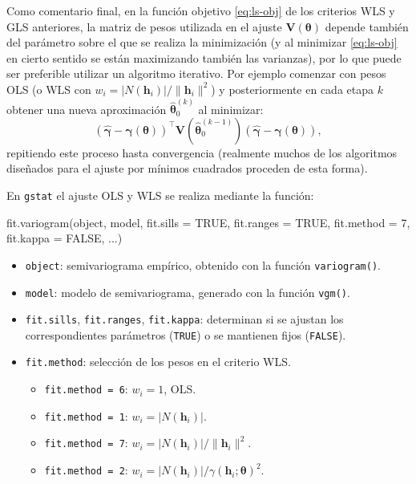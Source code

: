 \documentclass[
  spanish,
]{book}
\newenvironment{Shaded}{\begin{snugshade}}{\end{snugshade}}
\newcommand{\AttributeTok}[1]{\textcolor[rgb]{0.77,0.63,0.00}{#1}}
\newcommand{\ConstantTok}[1]{\textcolor[rgb]{0.00,0.00,0.00}{#1}}
\newcommand{\DecValTok}[1]{\textcolor[rgb]{0.00,0.00,0.81}{#1}}
\newcommand{\FunctionTok}[1]{\textcolor[rgb]{0.00,0.00,0.00}{#1}}
\newcommand{\NormalTok}[1]{#1}
\providecommand{\tightlist}{%
  \setlength{\itemsep}{0pt}\setlength{\parskip}{0pt}}
\theoremstyle{break}
\theoremstyle{definition}
\theoremstyle{definition}
\theoremstyle{definition}
\theoremstyle{definition}
\theoremstyle{remark}
\begin{document}
Como comentario final, en la función objetivo \eqref{eq:ls-obj} de los criterios WLS y GLS anteriores, la matriz de pesos utilizada en el ajuste \(\mathbf{V}(\boldsymbol{\theta})\) depende también del parámetro sobre el que se realiza la minimización (y al minimizar \eqref{eq:ls-obj} en cierto sentido se están maximizando también las varianzas), por lo que puede ser preferible utilizar un algoritmo iterativo.
Por ejemplo comenzar con pesos OLS (o WLS con \(w_{i} = \left| N(\mathbf{h}_{i})\right| / \| \mathbf{h}_{i} \|^2\)) y posteriormente en cada etapa \(k\) obtener una nueva aproximación \(\hat{\boldsymbol{\theta}}_{0}^{(k)}\) al minimizar:
\[\left( \hat{\boldsymbol{\gamma}} - \boldsymbol{\gamma}(\boldsymbol{\theta})\right)^{\top } \mathbf{V}(\hat{\boldsymbol{\theta}}_{0}^{(k-1)})\left( \hat{\boldsymbol{\gamma}} - \boldsymbol{\gamma}(\boldsymbol{\theta})\right),\]
repitiendo este proceso hasta convergencia (realmente muchos de los algoritmos diseñados para el ajuste por mínimos cuadrados proceden de esta forma).

En \texttt{gstat} el ajuste OLS y WLS se realiza mediante la función:

\begin{Shaded}
\begin{Highlighting}[]
\FunctionTok{fit.variogram}\NormalTok{(object, model, }\AttributeTok{fit.sills =} \ConstantTok{TRUE}\NormalTok{, }\AttributeTok{fit.ranges =} \ConstantTok{TRUE}\NormalTok{,}
              \AttributeTok{fit.method =} \DecValTok{7}\NormalTok{, }\AttributeTok{fit.kappa =} \ConstantTok{FALSE}\NormalTok{, ...)}
\end{Highlighting}
\end{Shaded}

\begin{itemize}
\item
  \texttt{object}: semivariograma empírico, obtenido con la función \texttt{variogram()}.
\item
  \texttt{model}: modelo de semivariograma, generado con la función \texttt{vgm()}.
\item
  \texttt{fit.sills}, \texttt{fit.ranges}, \texttt{fit.kappa}: determinan si se ajustan los correspondientes parámetros (\texttt{TRUE}) o se mantienen fijos (\texttt{FALSE}).
\item
  \texttt{fit.method}: selección de los pesos en el criterio WLS.

  \begin{itemize}
  \tightlist
  \item
    \texttt{fit.method\ =\ 6}: \(w_{i} = 1\), OLS.
  \item
    \texttt{fit.method\ =\ 1}: \(w_{i} = \left| N(\mathbf{h}_{i})\right|\).
  \item
    \texttt{fit.method\ =\ 7}: \(w_{i} = \left| N(\mathbf{h}_{i})\right| / \| \mathbf{h}_{i} \|^2\).
  \item
    \texttt{fit.method\ =\ 2}: \(w_{i} = \left| N(\mathbf{h}_{i})\right| /\gamma(\mathbf{h}_{i} ;\boldsymbol{\theta})^2\).
  \end{itemize}
\end{itemize}
\end{document}

